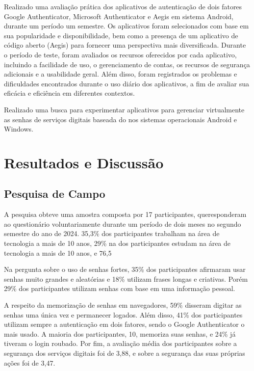 \documentclass[12pt]{article}
\begin{document}
Realizado uma avaliação prática dos aplicativos de autenticação de dois
fatores Google Authenticator, Microsoft Authenticator e Aegis em sistema
Android, durante um período um semestre. Os aplicativos foram selecionados
com base em sua popularidade e disponibilidade, bem como a presença de um
aplicativo de código aberto (Aegis) para fornecer uma perspectiva mais
diversificada.
Durante o período de teste, foram avaliados os recursos oferecidos por cada
aplicativo, incluindo a facilidade de uso, o gerenciamento de contas, os
recursos de segurança adicionais e a usabilidade geral.
Além disso, foram registrados os problemas e dificuldades encontrados
durante o uso diário dos aplicativos, a fim de avaliar sua eficácia e
eficiência em diferentes contextos.

Realizado uma busca para experimentar aplicativos para gerenciar
virtualmente as senhas de serviços digitais baseada do nos sistemas
operacionais Android e Windows.

\section{Resultados e Discussão}

\subsection{Pesquisa de Campo}

A pesquisa obteve uma amostra composta por 17 participantes, queresponderam
ao questionário voluntariamente durante um período de dois meses no segundo
semestre do ano de 2024.
35,3\% dos participantes trabalham na área de tecnologia a mais de 10 anos,
29\% na dos participantes estudam na área de tecnologia a mais de 10 anos,
e 76,5%

Na pergunta sobre o uso de senhas fortes, 35\% dos participantes afirmaram
usar senhas muito grandes e aleatórias e 18\% utilizam frases longas
e criativas. Porém 29\% dos participantes utilizam senhas com base em uma
informação pessoal.

A respeito da memorização de senhas em navegadores, 59\% disseram digitar as
senhas uma única vez e permanecer logados.
Além disso, 41\% dos participantes utilizam sempre a autenticação em dois
fatores, sendo o Google Authenticator o mais usado.
A maioria dos participantes, 10, memoriza suas senhas, e 24\% já tiveram o
login roubado.
Por fim, a avaliação média dos participantes sobre a segurança dos serviços
digitais foi de 3,88, e sobre a segurança das suas próprias ações foi de
3,47.
\end{document}
